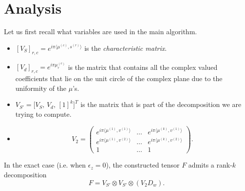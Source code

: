 \section{Analysis}
Let us first recall what variables are used in the main algorithm.
\begin{itemize}
    \item $[V_S]_{r,c}=e^{i\pi\langle\mu^{(c)},s^{(r)}\rangle}$ is the \textit{characteristic matrix}.
    \item $[V_d]_{r,c}=e^{i\pi\mu_r^{(c)}}$ is the matrix that contains all the complex valued coefficients that lie on the unit circle of the complex plane due to the uniformity of the $\mu$'s.
    \item $V_{S'}=\big[V_S,\, V_d,\, [1]^k\big]^T$ is the matrix that is part of the decomposition we are trying to compute.
    \item $$V_2=
    \begin{pmatrix}
        e^{i\pi\langle\mu^{(1)},v^{(1)}\rangle}&\ldots&e^{i\pi\langle\mu^{(k)},v^{(1)}\rangle}\\
        e^{i\pi\langle\mu^{(1)},v^{(2)}\rangle}&\ldots&e^{i\pi\langle\mu^{(k)},v^{(2)}\rangle}\\
        1&\ldots&1
    \end{pmatrix}.$$
\end{itemize}
\begin{fact}
    In the exact case (i.e. when $\epsilon_z=0$), the constructed tensor $F$ admits a rank-$k$ decomposition $$F=V_{S'}\otimes V_{S'}\otimes (V_2D_w).$$
\end{fact}
